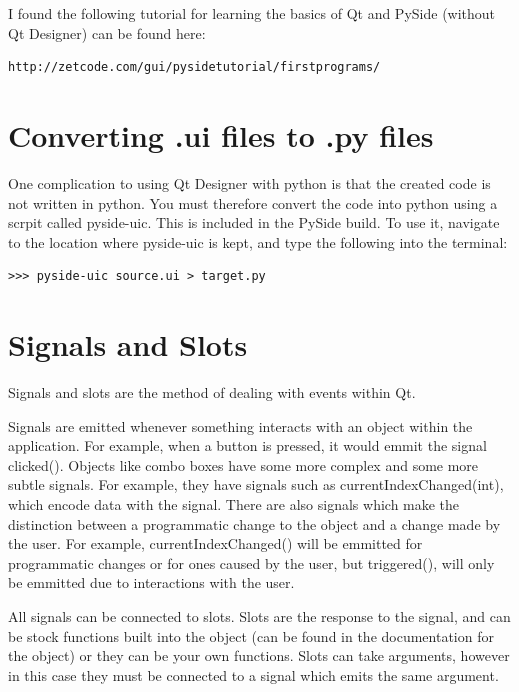 \documentclass[whitecover]{MO_report}
\begin{document}
I found the following tutorial for learning the basics of Qt and PySide
(without Qt Designer) can be found here:

\begin{verbatim}
http://zetcode.com/gui/pysidetutorial/firstprograms/
\end{verbatim}

\section{Converting .ui files to .py files}

One complication to using Qt Designer with python is that the created code is
not written in python. You must therefore convert the code into python using
a scrpit called pyside-uic. This is included in the PySide build. To use it,
navigate to the location where pyside-uic is kept, and type the following into
the terminal:

\begin{verbatim}
>>> pyside-uic source.ui > target.py
\end{verbatim}

\section{Signals and Slots}

Signals and slots are the method of dealing with events within Qt.

Signals are emitted whenever something interacts with an object within the
application. For example, when a button is pressed, it would emmit the signal
clicked(). Objects like combo boxes have some more complex and some more subtle
signals. For example, they have signals such as currentIndexChanged(int),
which encode data with the signal. There are also signals which make the
distinction between a programmatic change to the object and a change made by
the user. For example, currentIndexChanged() will be emmitted for programmatic
changes or for ones caused by the user, but triggered(), will only be emmitted
due to interactions with the user.

\vspace{4mm}

All signals can be connected to slots. Slots are the response to the signal,
and can be stock functions built into the object (can be found in the
documentation for the object) or they can be your own functions.
Slots can take arguments, however in this case they must be connected to a
signal which emits the same argument.
\end{document}
